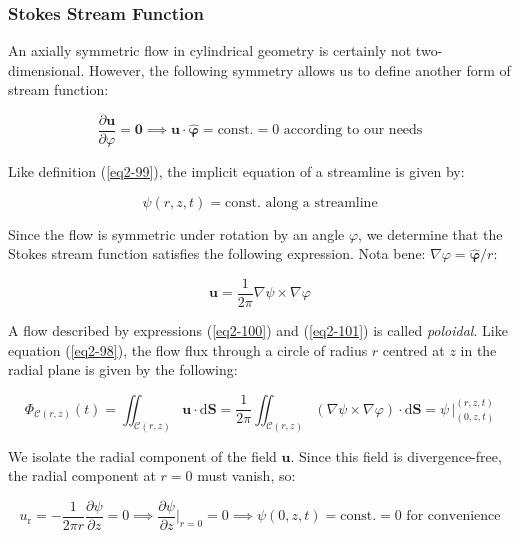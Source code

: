 \subsubsection{Stokes Stream Function}

\label{sec2-10-3-2}

An axially symmetric flow in cylindrical geometry is certainly not two-dimensional. However, the following symmetry allows us to define another form of stream function:

\begin{equation}
    \label{eq2-100}
    \frac{\partial\mathbf{u}}{\partial\varphi}=\mathbf{0}\implies\mathbf{u}\cdot\boldsymbol{\hat{\varphi}}=\text{const.}=0\,\,\text{according to our needs}
\end{equation}

Like definition (\ref{eq2-99}), the implicit equation of a streamline is given by:

\begin{equation}
    \psi(r,z,t)=\text{const. along a streamline}
\end{equation}

Since the flow is symmetric under rotation by an angle $\varphi$, we determine that the Stokes stream function satisfies the following expression. Nota bene: $\nabla\varphi=\boldsymbol{\hat{\varphi}}/r$:

\begin{equation}
    \label{eq2-101}
    \mathbf{u}=\frac{1}{2\pi}\nabla\psi\times\nabla\varphi
\end{equation}

A flow described by expressions (\ref{eq2-100}) and (\ref{eq2-101}) is called \textit{poloidal}. Like equation (\ref{eq2-98}), the flow flux through a circle of radius $r$ centred at $z$ in the radial plane is given by the following:

\begin{equation}
    \Phi_{\mathcal{C}(r,z)}(t)=\iint_{\mathcal{C}(r,z)}\mathbf{u}\cdot\mathrm{d}\mathbf{S}=\frac{1}{2\pi}\iint_{\mathcal{C}(r,z)}\left(\nabla\psi\times\nabla\varphi\right)\cdot\mathrm{d}\mathbf{S}=\psi\,\biggr|_{(0,z,t)}^{(r,z,t)}
\end{equation}

We isolate the radial component of the field $\mathbf{u}$. Since this field is divergence-free, the radial component at $r=0$ must vanish, so:

\begin{equation}
    u_\text{r}=-\frac{1}{2\pi r}\frac{\partial\psi}{\partial z}=0\implies\frac{\partial\psi}{\partial z}\biggr|_{r=0}=0\implies\psi(0,z,t)=\text{const.}=0\,\,\text{for convenience}
\end{equation}

